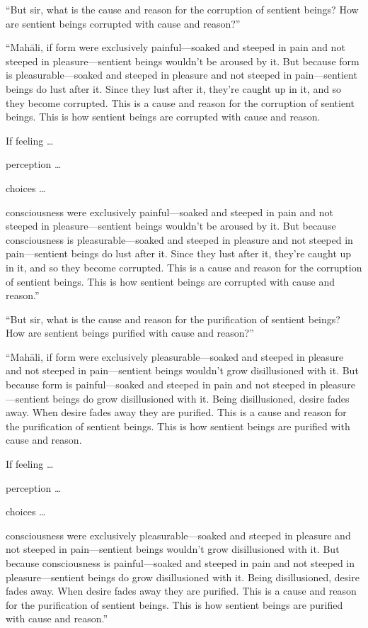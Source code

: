 \documentclass[12pt,openany]{book}%
\begin{document}
“But sir, what is the cause and reason for the corruption of sentient beings? How are sentient beings corrupted with cause and reason?” 

“\textsanskrit{Mahāli}, if form were exclusively painful—soaked and steeped in pain and not steeped in pleasure—sentient beings wouldn’t be aroused by it. But because form is pleasurable—soaked and steeped in pleasure and not steeped in pain—sentient beings do lust after it. Since they lust after it, they’re caught up in it, and so they become corrupted. This is a cause and reason for the corruption of sentient beings. This is how sentient beings are corrupted with cause and reason. 

If feeling … 

perception … 

choices … 

consciousness were exclusively painful—soaked and steeped in pain and not steeped in pleasure—sentient beings wouldn’t be aroused by it. But because consciousness is pleasurable—soaked and steeped in pleasure and not steeped in pain—sentient beings do lust after it. Since they lust after it, they’re caught up in it, and so they become corrupted. This is a cause and reason for the corruption of sentient beings. This is how sentient beings are corrupted with cause and reason.” 

“But sir, what is the cause and reason for the purification of sentient beings? How are sentient beings purified with cause and reason?” 

“\textsanskrit{Mahāli}, if form were exclusively pleasurable—soaked and steeped in pleasure and not steeped in pain—sentient beings wouldn’t grow disillusioned with it. But because form is painful—soaked and steeped in pain and not steeped in pleasure—sentient beings do grow disillusioned with it. Being disillusioned, desire fades away. When desire fades away they are purified. This is a cause and reason for the purification of sentient beings. This is how sentient beings are purified with cause and reason. 

If feeling … 

perception … 

choices … 

consciousness were exclusively pleasurable—soaked and steeped in pleasure and not steeped in pain—sentient beings wouldn’t grow disillusioned with it. But because consciousness is painful—soaked and steeped in pain and not steeped in pleasure—sentient beings do grow disillusioned with it. Being disillusioned, desire fades away. When desire fades away they are purified. This is a cause and reason for the purification of sentient beings. This is how sentient beings are purified with cause and reason.” 
\end{document}
